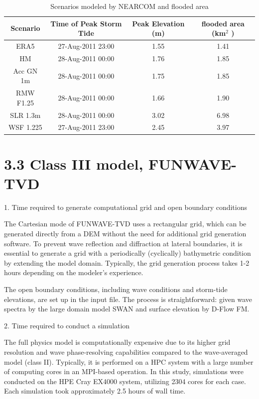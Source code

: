 \documentclass[11pt]{article}
\begin{document}
 \begin{table}[h!]
 \caption{Scenarios modeled by NEARCOM and flooded area}
 \centering
 \begin{tabular}[t]{c c c  c} \hline
  Scenario & Time of Peak Storm Tide  &  Peak Elevation (m)  &  flooded area (km$^2$ )    \\ \hline
  ERA5      & 27-Aug-2011 23:00  & 1.55   & 1.41  \\
  HM      & 28-Aug-2011 00:00  & 1.76   & 1.85 \\
  Acc GN 1m      & 28-Aug-2011 00:00  & 1.75   & 1.85  \\
  RMW F1.25      & 28-Aug-2011 00:00  & 1.66   & 1.90  \\
   SLR 1.3m      & 28-Aug-2011 00:00  & 3.02   & 6.98  \\
    WSF 1.225     & 27-Aug-2011 23:00  & 2.45   & 3.97  \\
     \hline
 \end{tabular}
\end{table}
 


\section*{3.3 Class III model, FUNWAVE-TVD}

1. Time required to generate computational grid and open boundary conditions

The Cartesian mode of FUNWAVE-TVD uses a rectangular grid, which can be generated directly from a DEM without the need for additional grid generation software. To prevent wave reflection and diffraction at lateral boundaries, it is essential to generate a grid with a periodically (cyclically) bathymetric condition by extending the model domain. Typically, the grid generation process takes 1-2 hours depending on the modeler's experience. 

The open boundary conditions, including wave conditions and storm-tide elevations, are set up in the input file. The process is straightforward:  given wave spectra by the large domain model SWAN and surface elevation by D-Flow FM. 


2. Time required to conduct a simulation 

 The full physics model is computationally expensive due to its higher grid resolution and wave phase-resolving capabilities compared to the wave-averaged model (class II). Typically, it is performed on a HPC system with a large number of computing cores in an MPI-based operation. In this study, simulations were conducted on the HPE Cray EX4000 system, utilizing 2304 cores for each case. Each simulation took approximately 2.5 hours of wall time. 
\end{document}

